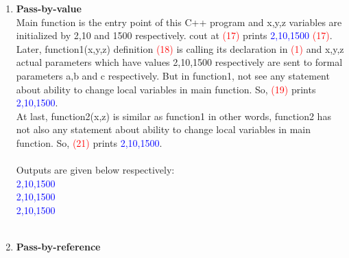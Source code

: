 \documentclass{article}
\begin{document}
\begin{enumerate}[label=\textbf{\alph*)}]
    \item \textbf{Pass-by-value}\\

Main function is the entry point of this C++ program and x,y,z variables are initialized by 2,10 and 1500 respectively. cout at \textcolor{red}{(17)} prints  \textcolor{blue}{2,10,1500} \textcolor{red}{(17)}. \\ Later, 
function1(x,y,z) definition \textcolor{red}{(18)} is calling its declaration in \textcolor{red}{(1)} and x,y,z actual parameters which have values 2,10,1500 respectively are sent to formal parameters a,b and c respectively. But in function1, not see any statement about ability to change local variables in main function. So, 
\textcolor{red}{(19)} prints 
\textcolor{blue}{2,10,1500}.\\
At last, function2(x,z) is similar as function1 in other words, function2 has not also any statement about ability to change local variables in main function. So, 
\textcolor{red}{(21)} prints 
\textcolor{blue}{2,10,1500}.
\\~\\Outputs are given below respectively: \\ \textcolor{blue}{2,10,1500\\2,10,1500\\2,10,1500}  \\~\\ 

    \item \textbf{Pass-by-reference} 


\end{enumerate}
\end{document}
